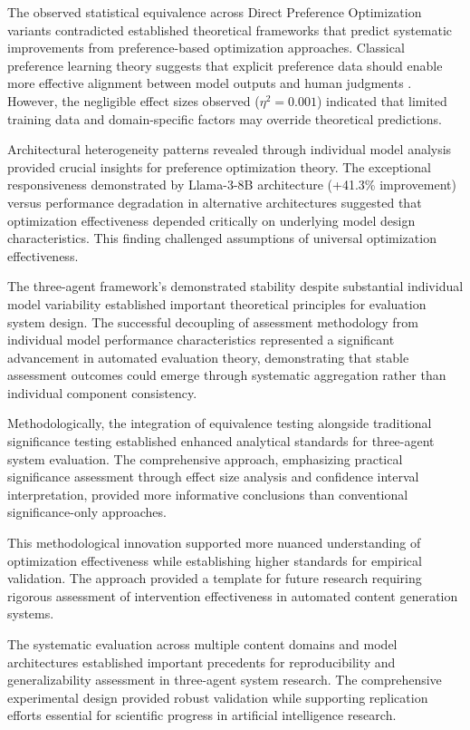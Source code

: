 The observed statistical equivalence across Direct Preference Optimization variants contradicted established theoretical frameworks that predict systematic improvements from preference-based optimization approaches. Classical preference learning theory suggests that explicit preference data should enable more effective alignment between model outputs and human judgments \cite{rafailov2023dpo}. However, the negligible effect sizes observed ($\eta^2 = 0.001$) indicated that limited training data and domain-specific factors may override theoretical predictions.

Architectural heterogeneity patterns revealed through individual model analysis provided crucial insights for preference optimization theory. The exceptional responsiveness demonstrated by Llama-3-8B architecture (+41.3\% improvement) versus performance degradation in alternative architectures suggested that optimization effectiveness depended critically on underlying model design characteristics. This finding challenged assumptions of universal optimization effectiveness.

The three-agent framework's demonstrated stability despite substantial individual model variability established important theoretical principles for evaluation system design. The successful decoupling of assessment methodology from individual model performance characteristics represented a significant advancement in automated evaluation theory, demonstrating that stable assessment outcomes could emerge through systematic aggregation rather than individual component consistency.

Methodologically, the integration of equivalence testing alongside traditional significance testing established enhanced analytical standards for three-agent system evaluation. The comprehensive approach, emphasizing practical significance assessment through effect size analysis and confidence interval interpretation, provided more informative conclusions than conventional significance-only approaches.

This methodological innovation supported more nuanced understanding of optimization effectiveness while establishing higher standards for empirical validation. The approach provided a template for future research requiring rigorous assessment of intervention effectiveness in automated content generation systems.

The systematic evaluation across multiple content domains and model architectures established important precedents for reproducibility and generalizability assessment in three-agent system research. The comprehensive experimental design provided robust validation while supporting replication efforts essential for scientific progress in artificial intelligence research.



